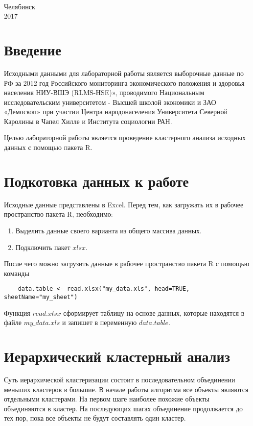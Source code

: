 \documentclass[12pt,a4paper,titlepage]{article}
\begin{document}
\begin{titlepage}
\begin{center}
{\begin{tabular}[t]{lllllllllllllllllll}
\end{tabular}
\\[1.5cm]}

\small{Челябинск}\\
\small{2017}
\end{center}
\end{titlepage}
\tableofcontents
\section{Введение}
  \par
  Исходными данными для лабораторной работы является выборочные данные по РФ за 2012 год Российского мониторинга экономического положения и здоровья населения НИУ-ВШЭ (RLMS-HSE)», проводимого Национальным исследовательским университетом - Высшей школой экономики и ЗАО «Демоскоп» при участии Центра народонаселения Университета Северной Каролины в Чапел Хилле и Института социологии РАН.

  \par
  Целью лабораторной работы является проведение кластерного анализа исходных данных с помощью пакета R.

\section{Подкотовка данных к работе}
  Исходные данные представлены в Excel.
  Перед тем, как загружать их в рабочее пространство пакета R, необходимо:
  \begin{enumerate}
    \item Выделить данные своего варианта из общего массива данных.
    \item Подключить пакет $xlsx$.
  \end{enumerate}

  После чего можно загрузить данные в рабочее пространство пакета R с помощью команды
  \begin{lstlisting}
    data.table <- read.xlsx("my_data.xls", head=TRUE, sheetName="my_sheet")
  \end{lstlisting}

  Функция $read.xlsx$ сформирует таблицу на основе данных, которые находятся в файле $my\_data.xls$ и запишет в переменную $data.table$.
\clearpage

\section{Иерархический кластерный анализ}
  \par
  Суть иерархической кластеризации состоит в последовательном объединении меньших кластеров в большие.
  В начале работы алгоритма все объекты являются отдельными кластерами. На первом шаге наиболее похожие объекты объединяются в кластер.
  На последующих шагах объединение продолжается до тех пор, пока все объекты не будут составлять один кластер.
\end{document}
